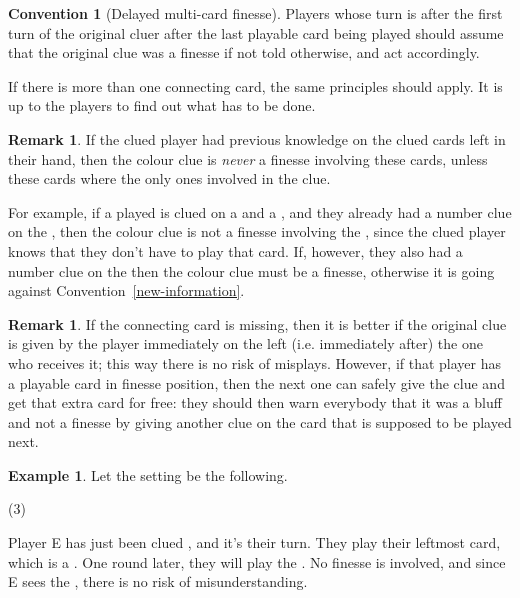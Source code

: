 \documentclass[a4paper]{article}
\theoremstyle{plain}
\theoremstyle{definition}
\newtheorem{remark}[theorem]{Remark}
\newtheorem{example}[theorem]{Example}
\newtheorem{convention}[theorem]{Convention}
\begin{document}
\begin{convention}[Delayed multi-card finesse]
	Players whose turn is after the first turn of the original cluer after the last playable card being played should assume that the original clue was a finesse if not told otherwise, and act accordingly.
	
	If there is more than one connecting card, the same principles should apply. It is up to the players to find out what has to be done.
\end{convention}

\begin{remark}
	If the clued player had previous knowledge on the clued cards left in their hand, then the colour clue is \textit{never} a finesse involving these cards, unless these cards where the only ones involved in the clue.
\end{remark}

For example, if a played is clued on a  and a , and they already had a number clue on the , then the colour clue is not a finesse involving the , since the clued player knows that they don't have to play that card. If, however, they also had a number clue on the  then the colour clue must be a finesse, otherwise it is going against Convention~\ref{new-information}.

\begin{remark}
	If the connecting card is missing, then it is better if the original clue is given by the player immediately on the left (i.e. immediately after) the one who receives it; this way there is no risk of misplays. However, if that player has a playable card in finesse position, then the next one can safely give the clue and get that extra card for free: they should then warn everybody that it was a bluff and not a finesse by giving another clue on the card that is supposed to be played next.
\end{remark}

\begin{example}
	
	Let the setting be the following.
	
	\begin{tasks}(3)
		\task[+]      
		\task[A]    
		\task[B]    
		\task[C]    
		\task[D]    
		\task[E]    
	\end{tasks}
	
	Player E has just been clued , and it's their turn. They play their leftmost card, which is a . One round later, they will play the . No finesse is involved, and since E sees the , there is no risk of misunderstanding.
	
\end{example}
\end{document}
